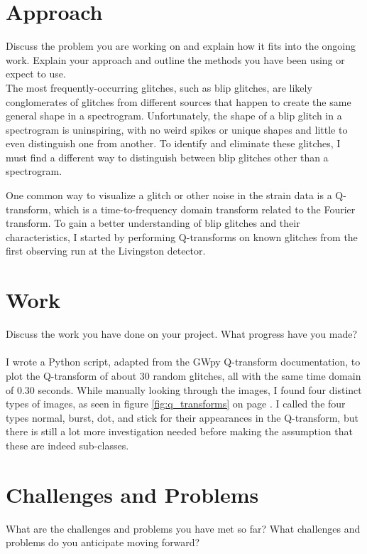 \documentclass[a4paper]{article}
\begin{document}
\section{Approach} Discuss the problem you are working on and explain how it fits into the ongoing work. Explain your approach and outline the methods you have been using or expect to use. ~\\

The most frequently-occurring glitches, such as blip glitches, are likely conglomerates of glitches from different sources that happen to create the same general shape in a spectrogram. Unfortunately, the shape of a blip glitch in a spectrogram is uninspiring, with no weird spikes or unique shapes and little to even distinguish one from another. To identify and eliminate these glitches, I must find a different way to distinguish between blip glitches other than a spectrogram. 

One common way to visualize a glitch or other noise in the strain data is a Q-transform, which is a time-to-frequency domain transform related to the Fourier transform. To gain a better understanding of blip glitches and their characteristics, I started by performing Q-transforms on known glitches from the first observing run at the Livingston detector. 


\section{Work} Discuss the work you have done on your project. What progress have you made? ~\\

I wrote a Python script, adapted from the GWpy Q-transform documentation, to plot the Q-transform of about 30 random glitches, all with the same time domain of 0.30 seconds. While manually looking through the images, I found four distinct types of images, as seen in figure \ref{fig:q_transforms} on page \pageref{fig:q_transforms}. I called the four types normal, burst, dot, and stick for their appearances in the Q-transform, but there is still a lot more investigation needed before making the assumption that these are indeed sub-classes.

\section{Challenges and Problems} What are the challenges and problems you have met so far? What challenges and problems do you anticipate moving forward? ~\\
\end{document}
